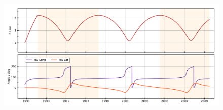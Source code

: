 \documentclass{beamer}
\begin{document}
\begin{frame}{}
\begin{figure}
	\includegraphics[scale=0.28]{Pics/HG_coord.pdf}
	
\end{figure}
\end{frame}






\end{document}

